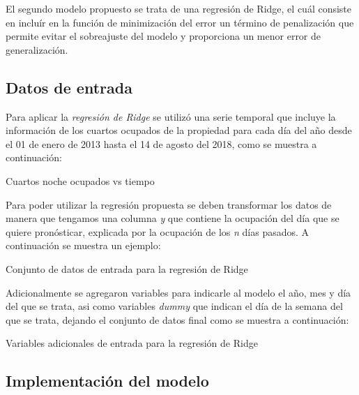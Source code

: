 El segundo modelo propuesto se trata de una regresión de Ridge, el cuál consiste en incluír en la función de minimización del error un término de penalización que permite evitar el sobreajuste del modelo y proporciona un menor error de generalización.

\subsection*{Datos de entrada}

Para aplicar la \emph{regresión de Ridge} se utilizó una serie temporal que incluye la información de los cuartos ocupados de la propiedad para cada día del año desde el 01 de enero de 2013 hasta el 14 de agosto del 2018, como se muestra a continuación:

\begin{table}[H]
  \centering
  \par
  \caption{Cuartos noche ocupados vs tiempo}
\end{table}

Para poder utilizar la regresión propuesta se deben transformar los datos de manera que tengamos una columna \emph{y} que contiene la ocupación del día que se quiere pronósticar, explicada por la ocupación de los \emph{n} días pasados. A continuación se muestra un ejemplo:

\begin{table}[H]
  \centering
  \par
  \caption{Conjunto de datos de entrada para la regresión de Ridge}
\end{table}

Adicionalmente se agregaron variables para indicarle al modelo el año, mes y día del que se trata, asi como variables \emph{dummy} que indican el día de la semana del que se trata, dejando el conjunto de datos final como se muestra a continuación:

\begin{table}[H]
  \centering
  \par
  \caption{Variables adicionales de entrada para la regresión de Ridge}
\end{table}

\subsection*{Implementación del modelo}

